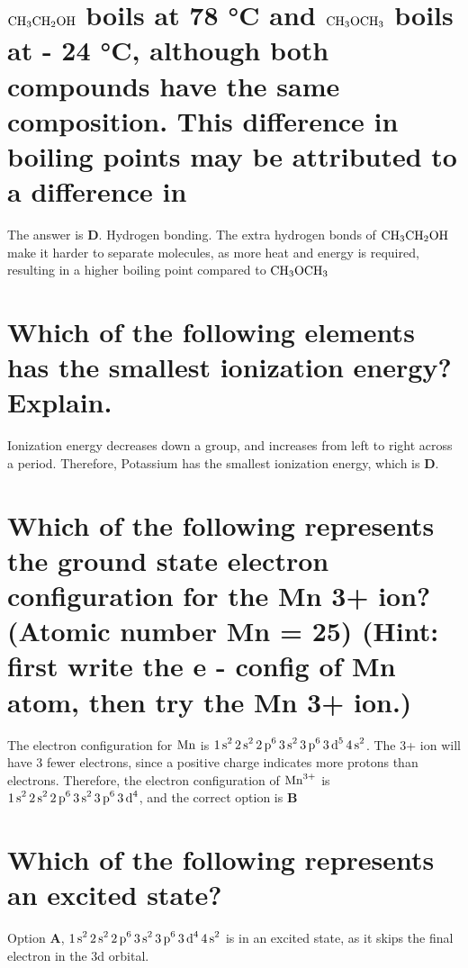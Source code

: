 \documentclass[11pt]{article}
\begin{document}
\section{\(\ce{CH3CH2OH}\) boils at 78 °C and \(\ce{CH3OCH3}\) boils at - 24 °C, although both compounds have the same composition. This difference in boiling points may be attributed to a difference in}
\label{sec:orgb6ff638}
The answer is \textbf{D}. Hydrogen bonding. The extra hydrogen bonds of \(\ce{CH3CH2OH}\) make it harder to separate molecules, as more heat and energy is required, resulting in a higher boiling point compared to \(\ce{CH3OCH3}\)

\section{Which of the following elements has the smallest ionization energy? Explain.}
\label{sec:org0ea8d20}
Ionization energy decreases down a group, and increases from left to right
across a period. Therefore, Potassium has the smallest ionization energy, which is \textbf{D}.

\section{Which of the following represents the ground state electron configuration for the Mn 3+ ion? (Atomic number Mn = 25) (Hint: first write the e - config of Mn atom, then try the Mn 3+ ion.)}
\label{sec:org03ee867}
The electron configuration for \(\ce{Mn}\) is \(\ce{1s^2 2s^2 2p^6 3s^2 3p^6 3d^5 4s^2}\). The 3+ ion will have 3 fewer electrons, since a positive charge indicates more protons than electrons. Therefore, the electron configuration of \(\ce{Mn^{3+}}\) is \(\ce{1s^2 2s^2 2p^6 3s^2 3p^6 3d^4}\), and the correct option is \textbf{B}

\section{Which of the following represents an excited state?}
\label{sec:org64797bd}
Option \textbf{A}, \(\ce{1s^2 2s^2 2p^6 3s^2 3p^6 3d^4 4s^2}\) is in an excited state, as it skips the final electron in the 3d orbital.
\end{document}
